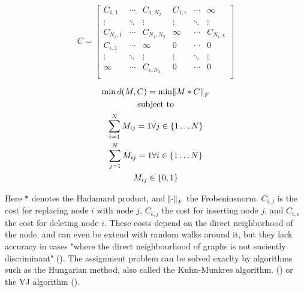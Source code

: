 \noindent
\begin{minipage}{.5\linewidth}

     \[
          C=
               \left[
               \begin{array}{ccc|ccc}
                    C_{1,1} & \dotsi & C_{1, N_2} & C_{1, \epsilon} & \dotsi & \infty \\
                    \vdots & \ddots & \vdots & \vdots & \ddots & \vdots \\
                    C_{N_1, 1} & \dotsi & C_{N_1, N_2} & \infty & \dotsi & C_{N_1, \epsilon} \\
                    \hline
                    C_{\epsilon, 1} & \dotsi & \infty & 0 & \dotsi & 0 \\
                    \vdots & \ddots & \vdots & \vdots & \ddots & \vdots \\
                    \infty & \dotsi & C_{\epsilon, N_2} & 0 & \dotsi & 0 \\
               \end{array}
               \right]
     \]

\end{minipage}%
\begin{minipage}{.5\linewidth}

     \begin{equation}
          \begin{gathered}
               \min d(M, C) = \min \norm{M * C}_F \\
               \text{subject to} \\
               \sum_{i = 1}^{N} M_{ij} = 1 \forall j \in \{1 \dots N\} \\
               \sum_{j = 1}^{N} M_{ij} = 1 \forall i \in \{1 \dots N\} \\
               M_{ij} \in \{0, 1\}
          \end{gathered}
     \end{equation}

\end{minipage}


\vspace{.2cm}

Here $*$ denotes the Hadamard product, and  $\norm{\cdot}_F $ the Frobeniusnorm. $C_{i, j}$ is the cost for replacing node $i$ with node $j$, $C_{\epsilon, j}$ the cost for inserting node $j$, and $C_{i, \epsilon}$ the cost for deleting node $i$. These costs depend on the direct neighborhood of the node, and can even be extend with random walks around it, but they lack accuracy in cases "where the direct neighbourhood of graphs is not suciently discriminant" (\citealp{hungarian2009}). The assignment problem can be solved exaclty by algorithms such as the Hungarian method, also called the Kuhn-Munkres algorithm. (\citealp{hungarian1955}) or the VJ algorithm (\citealp{vj1987}).

